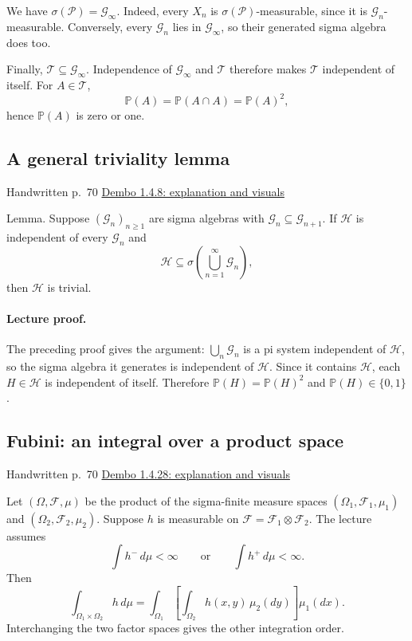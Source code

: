 \documentclass[11pt,letterpaper]{article}
\newcommand{\lecturesection}[1]{\subsection{#1}}
\begin{document}
We have $\sigma(\mathcal P)=\mathcal G_\infty$. Indeed, every $X_n$ is $\sigma(\mathcal P)$-measurable, since it is $\mathcal G_n$-measurable. Conversely, every $\mathcal G_n$ lies in $\mathcal G_\infty$, so their generated sigma algebra does too.

Finally, $\mathcal T\subseteq\mathcal G_\infty$. Independence of $\mathcal G_\infty$ and $\mathcal T$ therefore makes $\mathcal T$ independent of itself. For $A\in\mathcal T$, \[\mathbb P(A)=\mathbb P(A\cap A)=\mathbb P(A)^2,\] hence $\mathbb P(A)$ is zero or one.

\hypertarget{l8-s4}{}
\lecturesection{A general triviality lemma}
{\small\textcolor{lectureink}{Handwritten p.\ 70} \quad \href{https://josephrbailey.com/probability/\#entry-1-4-8}{Dembo 1.4.8: explanation and visuals}}

Lemma. Suppose $(\mathcal G_n)_{n\ge1}$ are sigma algebras with $\mathcal G_n\subseteq\mathcal G_{n+1}$. If $\mathcal H$ is independent of every $\mathcal G_n$ and \[\mathcal H\subseteq\sigma\left(\bigcup_{n=1}^{\infty}\mathcal G_n\right),\] then $\mathcal H$ is trivial.

\paragraph{Lecture proof.}
The preceding proof gives the argument: $\bigcup_n\mathcal G_n$ is a pi system independent of $\mathcal H$, so the sigma algebra it generates is independent of $\mathcal H$. Since it contains $\mathcal H$, each $H\in\mathcal H$ is independent of itself. Therefore $\mathbb P(H)=\mathbb P(H)^2$ and $\mathbb P(H)\in\{0,1\}$.

\hypertarget{l8-s5}{}
\lecturesection{Fubini: an integral over a product space}
{\small\textcolor{lectureink}{Handwritten p.\ 70} \quad \href{https://josephrbailey.com/probability/\#entry-1-4-28}{Dembo 1.4.28: explanation and visuals}}

Let $(\Omega,\mathcal F,\mu)$ be the product of the sigma-finite measure spaces $(\Omega_1,\mathcal F_1,\mu_1)$ and $(\Omega_2,\mathcal F_2,\mu_2)$. Suppose $h$ is measurable on $\mathcal F=\mathcal F_1\otimes\mathcal F_2$. The lecture assumes \[\int h^-\,d\mu<\infty\qquad\text{or}\qquad\int h^+\,d\mu<\infty.\] Then \[\int_{\Omega_1\times\Omega_2}h\,d\mu=\int_{\Omega_1}\left[\int_{\Omega_2}h(x,y)\,\mu_2(dy)\right]\mu_1(dx).\] Interchanging the two factor spaces gives the other integration order.
\end{document}
